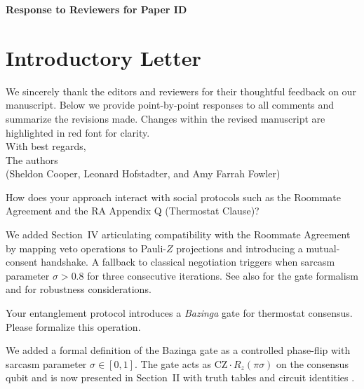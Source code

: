 \documentclass[a4paper,11pt]{article}
\begin{document}
\pagestyle{fancy}

\begin{center}
    {\Large \textbf{Response to Reviewers for Paper ID \printpaperid}}
\end{center}

\begin{center}
    {\large \textit{\printpapertitle}}
\end{center}

\vspace{1em}

\section*{Introductory Letter}
We sincerely thank the editors and reviewers for their thoughtful feedback on our manuscript. Below we provide point-by-point responses to all comments and summarize the revisions made. Changes within the revised manuscript are highlighted in red font for clarity.\\

\noindent With best regards,\\
The authors \\
{(Sheldon Cooper, Leonard Hofstadter, and Amy Farrah Fowler)}


\begin{question}[q:agreement]
How does your approach interact with social protocols such as the Roommate Agreement and the RA Appendix Q (Thermostat Clause)?
\end{question}
\begin{answer}[a:agreement]
We added Section~IV articulating compatibility with the Roommate Agreement by mapping veto operations to Pauli-$Z$ projections and introducing a mutual-consent handshake. A fallback to classical negotiation triggers when sarcasm parameter $\sigma>0.8$ for three consecutive iterations. See also  for the gate formalism and  for robustness considerations.
\end{answer}


\begin{question}[q:model]
Your entanglement protocol introduces a \emph{Bazinga} gate for thermostat consensus. Please formalize this operation.
\end{question}
\begin{answer}[a:model]
We added a formal definition of the Bazinga gate as a controlled phase-flip with sarcasm parameter $\sigma\in[0,1]$. The gate acts as $\mathrm{CZ}\cdot R_z(\pi\sigma)$ on the consensus qubit and is now presented in Section~II with truth tables and circuit identities \cite{cooper2011roommate}.
\end{answer}
\end{document}
